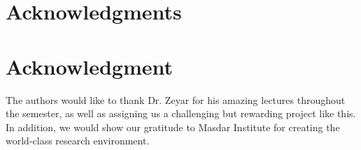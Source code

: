 \documentclass[12pt,journal,compsoc]{IEEEtran}
\begin{document}
%



\appendices







\ifCLASSOPTIONcompsoc
  \section*{Acknowledgments}
\else
  \section*{Acknowledgment}
\fi


The authors would like to thank Dr. Zeyar for his amazing lectures throughout the semester, as well as assigning us a challenging but rewarding project like this. In addition, we would show our gratitude to Masdar Institute for creating the world-class research environment.
\end{document}
